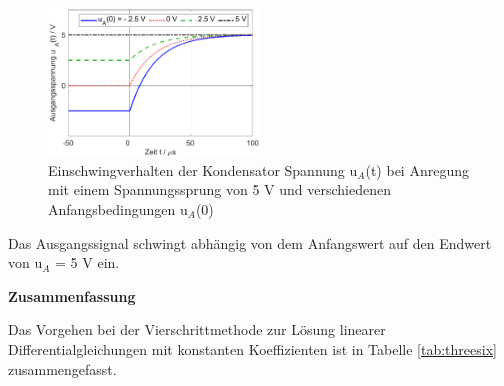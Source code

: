 \begin{figure}[H]
  \centerline{\includegraphics[width=0.5\textwidth]{Kapitel2/Bilder/image15}}
  \caption{Einschwingverhalten der Kondensator Spannung u${}_{A}$(t) bei Anregung mit einem Spannungssprung von 5 V und verschiedenen Anfangsbedingungen u${}_{A}$(0)}
  \label{fig:RCEinschwingenAnfangsbedingungen}
\end{figure}

\noindent Das Ausgangssignal schwingt abhängig von dem Anfangswert auf den Endwert von u$_{A}$ = 5 V ein.\bigskip
\clearpage

{\selectfont
\noindent\textbf{Zusammenfassung}}\smallskip

\noindent Das Vorgehen bei der Vierschrittmethode zur Lösung linearer Differentialgleichungen mit konstanten Koeffizienten ist in Tabelle \ref{tab:threesix} zusammengefasst.

